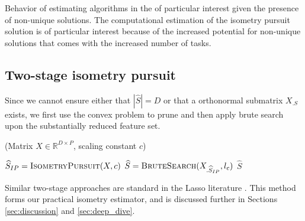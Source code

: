 Behavior of estimating algorithms in the of particular interest given the presence of non-unique solutions.
The computational estimation of the isometry pursuit solution is of particular interest because of the increased potential for non-unique solutions that comes with the increased number of tasks.



\subsection{Two-stage isometry pursuit}

Since we cannot ensure either that $|\widehat {  S}| = D$ or that a orthonormal submatrix $X_{.S}$ exists, we first use the convex problem to prune and then apply brute search upon the substantially reduced feature set.

\begin{algorithm}[H]
\caption{\tsip(Matrix ${X} \in \mathbb{R}^{D \times P}$, scaling constant $c$)}
\begin{algorithmic}[1]
\STATE $\widehat{S}_{IP} = \text{{\sc IsometryPursuit}}( X, c)$
\STATE $\widehat{S} = \text {{\sc BruteSearch}}({X}_{.\widehat{S}_{IP}}, l_c)$
 $\widehat{S}$
\end{algorithmic}
\end{algorithm}

Similar two-stage approaches are standard in the Lasso literature \cite{Hesterberg2008-iy}.
This method forms our practical isometry estimator, and is discussed further in Sections \ref{sec:discussion} and \ref{sec:deep_dive}.